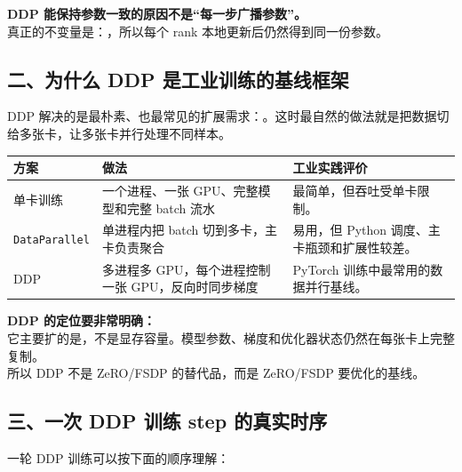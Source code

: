 \begin{intubox}
\textbf{DDP 能保持参数一致的原因不是“每一步广播参数”。}\\
真正的不变量是：，所以每个 rank 本地更新后仍然得到同一份参数。
\end{intubox}

\subsection{二、为什么 DDP 是工业训练的基线框架}

DDP 解决的是最朴素、也最常见的扩展需求：。这时最自然的做法就是把数据切给多张卡，让多张卡并行处理不同样本。

\begin{center}
{\small
\begin{tabular}{p{3cm}p{4.8cm}p{5.1cm}}
\hline
\textbf{方案} & \textbf{做法} & \textbf{工业实践评价} \\
\hline
单卡训练 & 一个进程、一张 GPU、完整模型和完整 batch 流水 & 最简单，但吞吐受单卡限制。 \\
\texttt{DataParallel} & 单进程内把 batch 切到多卡，主卡负责聚合 & 易用，但 Python 调度、主卡瓶颈和扩展性较差。 \\
DDP & 多进程多 GPU，每个进程控制一张 GPU，反向时同步梯度 & PyTorch 训练中最常用的数据并行基线。 \\
\hline
\end{tabular}
}
\end{center}

\begin{warnbox}
\textbf{DDP 的定位要非常明确：}\\
它主要扩的是，不是显存容量。模型参数、梯度和优化器状态仍然在每张卡上完整复制。\\
所以 DDP 不是 ZeRO/FSDP 的替代品，而是 ZeRO/FSDP 要优化的基线。
\end{warnbox}

\subsection{三、一次 DDP 训练 step 的真实时序}

一轮 DDP 训练可以按下面的顺序理解：


